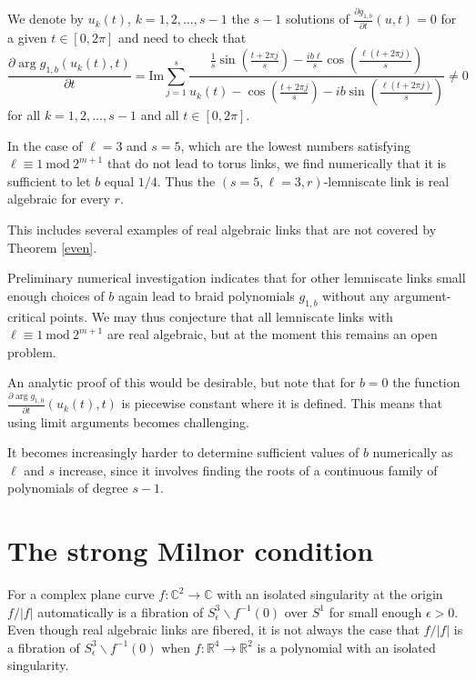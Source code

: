 \documentclass[notitlepage,12pt]{revtex4-1}
\begin{document}
We denote by $u_{k}(t)$, $k=1,2,\ldots,s-1$ the $s-1$ solutions of $\frac{\partial g_{1,b}}{\partial t}(u,t)=0$ for a given $t\in[0,2\pi]$ and need to check that 
\begin{equation}\frac{\partial \arg g_{1,b}(u_{k}(t),t)}{\partial t}=\mathrm{Im} \sum_{j=1}^{s}\frac{\frac{1}{s}\sin\left(\frac{t+2\pi j}{s}\right)-\frac{ib\ell}{s}\cos\left(\frac{\ell(t+2\pi j)}{s}\right)}{u_{k}(t)-\cos\left(\frac{t+2\pi j}{s}\right)-ib\sin\left(\frac{\ell(t+2\pi j)}{s}\right)}\neq 0
\end{equation}
for all $k=1,2,\ldots,s-1$ and all $t\in[0,2\pi]$. 

In the case of $\ell=3$ and $s=5$, which are the lowest numbers satisfying $\ell\equiv 1\ \mathrm{mod}\  2^{m+1}$ that do not lead to torus links, we find numerically that it is sufficient to let $b$ equal $1/4$. Thus the $(s=5,\ell=3,r)$-lemniscate link is real algebraic for every $r$.

This includes several examples of real algebraic links that are not covered by Theorem \ref{even}.

Preliminary numerical investigation indicates that for other lemniscate links small enough choices of $b$ again lead to braid polynomials $g_{1,b}$ without any argument-critical points. We may thus conjecture that all lemniscate links with $\ell\equiv 1\ \mathrm{mod}\  2^{m+1}$ are real algebraic, but at the moment this remains an open problem.

An analytic proof of this would be desirable, but note that for $b=0$ the function $\frac{\partial \arg g_{1,0}}{\partial t}(u_{k}(t),t)$ is piecewise constant where it is defined. This means that using limit arguments becomes challenging.

It becomes increasingly harder to determine sufficient values of $b$ numerically as $\ell$ and $s$ increase, since it involves finding the roots of a continuous family of polynomials of degree $s-1$.

\section{The strong Milnor condition}
\label{milnor}
For a complex plane curve $f:\mathbb{C}^2\to\mathbb{C}$ with an isolated singularity at the origin $f/|f|$ automatically is a fibration of $S^3_{\epsilon}\backslash f^{-1}(0)$ over $S^1$ for small enough $\epsilon>0$. Even though real algebraic links are fibered, it is not always the case that $f/|f|$ is a fibration of $S^3_{\epsilon}\backslash f^{-1}(0)$ when $f:\mathbb{R}^4\to\mathbb{R}^2$ is a polynomial with an isolated singularity.
\end{document}
